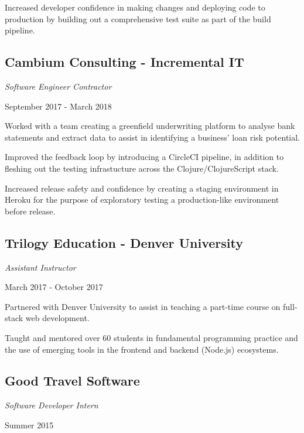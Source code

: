 Increased developer confidence in making changes and deploying code to
production by building out a comprehensive test suite as part of the build
pipeline.

\subsection*{Cambium Consulting - Incremental IT}
\noindent\begin{minipage}[b]{0.5\textwidth}
  \flushleft
  \emph{Software Engineer Contractor}
\end{minipage}
\noindent\begin{minipage}[b]{0.5\textwidth}
  \flushright
  September 2017 - March 2018
\end{minipage}

Worked with a team creating a greenfield underwriting platform to analyse bank
statements and extract data to assist in identifying a business' loan risk
potential.

Improved the feedback loop by introducing a CircleCI pipeline, in addition
to fleshing out the testing infrastucture across the Clojure/ClojureScript
stack.

Increased release safety and confidence by creating a staging environment in
Heroku for the purpose of exploratory testing a production-like environment
before release.

\subsection*{Trilogy Education - Denver University}
\noindent\begin{minipage}[b]{0.5\textwidth}
  \flushleft
  \emph{Assistant Instructor}
\end{minipage}
\noindent\begin{minipage}[b]{0.5\textwidth}
  \flushright
  March 2017 - October 2017
\end{minipage}

Partnered with Denver University to assist in teaching a part-time course on
full-stack web development.

Taught and mentored over 60 students in fundamental programming practice and
the use of emerging tools in the frontend and backend (Node.js) ecosystems.

\subsection*{Good Travel Software}
\noindent\begin{minipage}[b]{0.5\textwidth}
  \flushleft
  \emph{Software Developer Intern}
\end{minipage}
\noindent\begin{minipage}[b]{0.5\textwidth}
  \flushright
  Summer 2015
\end{minipage}

